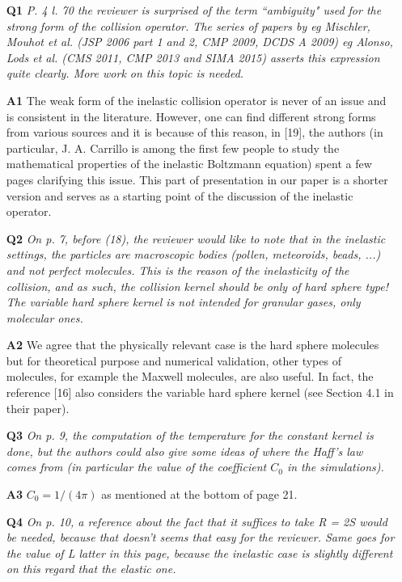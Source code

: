 \documentclass[11pt]{article}
\begin{document}
\begin{itemize}

\item[{\bf Q1}] {\it P. 4 l. 70 the reviewer is surprised of the term ``ambiguity" used for the strong form of the collision operator. The series of papers by eg Mischler, Mouhot et al. (JSP 2006 part 1 and 2, CMP 2009, DCDS A 2009) eg Alonso, Lods et al. (CMS 2011, CMP 2013 and SIMA 2015) asserts this expression quite clearly. More work on this topic is needed.}

\item[{\bf A1}] The weak form of the inelastic collision operator is never of an issue and is consistent in the literature. However, one can find different strong forms from various sources and it is because of this reason, in [19], the authors (in particular, J. A. Carrillo is among the first few people to study the mathematical properties of the inelastic Boltzmann equation) spent a few pages clarifying this issue. This part of presentation in our paper is a shorter version and serves as a starting point of the discussion of the inelastic operator.

\item[{\bf Q2}] {\it On p. 7, before (18), the reviewer would like to note that in the inelastic settings, the particles are macroscopic bodies (pollen, meteoroids, beads, ...) and not perfect molecules. This is the reason of the inelasticity of the collision, and as such, the collision kernel should be only of hard sphere type! The variable hard sphere kernel is not intended for granular gases, only molecular ones.}

\item[{\bf A2}] We agree that the physically relevant case is the hard sphere molecules but for theoretical purpose and numerical validation, other types of molecules, for example the Maxwell molecules, are also useful. In fact, the reference [16] also considers the variable hard sphere kernel (see Section 4.1 in their paper).

\item[{\bf Q3}] {\it On p. 9, the computation of the temperature for the constant kernel is done, but the authors could also give some ideas of where the Haff's law comes from (in particular the value of the coefficient $C_0$ in the simulations).
}

\item[{\bf A3}] $C_0=1/(4\pi)$ as mentioned at the bottom of page 21.


\item[{\bf Q4}] {\it On p. 10, a reference about the fact that it suffices to take R = 2S would be needed, because that doesn't seems that easy for the reviewer. Same goes for the value of L latter in this page, because the inelastic case is slightly different on this regard that the elastic one.}


\end{itemize}
\end{document}
